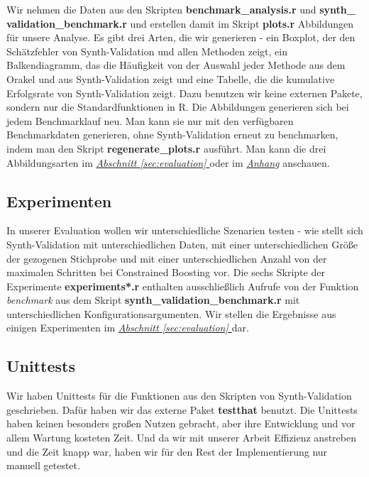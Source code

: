 \documentclass[12pt,a4paper,twoside]{scrartcl}
\numberwithin{equation}{section}
\newcommand{\refsec}[1]{\emph{\hyperref[#1]{Abschnitt \ref*{#1} }}}
\begin{document}
Wir nehmen die Daten aus den Skripten \textbf{benchmark\_analysis.r} und \textbf{synth\_\\validation\_benchmark.r} und erstellen damit im Skript \textbf{plots.r} Abbildungen für unsere Analyse. Es gibt drei Arten, die wir generieren - ein Boxplot, der den Schätzfehler von Synth-Validation und allen Methoden zeigt, ein Balkendiagramm, das die Häufigkeit von der Auswahl jeder Methode aus dem Orakel und aus Synth-Validation zeigt und eine Tabelle, die die kumulative Erfolgsrate von Synth-Validation zeigt. Dazu benutzen wir keine externen Pakete, sondern nur die Standardfunktionen in R. Die Abbildungen generieren sich bei jedem Benchmarklauf neu. Man kann sie nur mit den verfügbaren Benchmarkdaten generieren, ohne Synth-Validation erneut zu benchmarken, indem man den Skript \textbf{regenerate\_plots.r} ausführt. Man kann die drei Abbildungsarten im \refsec{sec:evaluation} oder im \emph{\hyperref[anhang]{Anhang}} anschauen.


\subsection{Experimenten}\label{subsec:experimenten}
In unserer Evaluation wollen wir unterschiedliche Szenarien testen - wie stellt sich Synth-Validation mit unterschiedlichen Daten, mit einer unterschiedlichen Größe der gezogenen Stichprobe und mit einer unterschiedlichen Anzahl von der maximalen Schritten bei Constrained Boosting vor. Die sechs Skripte der Experimente \textbf{experiments*.r} enthalten ausschließlich Aufrufe von der Funktion \emph{benchmark} aus dem Skript \textbf{synth\_validation\_benchmark.r} mit unterschiedlichen Konfigurationsargumenten. Wir stellen die Ergebnisse aus einigen Experimenten im \refsec{sec:evaluation} dar.\par

\subsection{Unittests}\label{subsec:unitTests}
Wir haben Unittests für die Funktionen aus den Skripten von Synth-Validation geschrieben. Dafür haben wir das externe Paket \textbf{testthat} benutzt. Die Unittests haben keinen besonders großen Nutzen gebracht, aber ihre Entwicklung und vor allem Wartung kosteten Zeit. Und da wir mit unserer Arbeit Effizienz anstreben und die Zeit knapp war, haben wir für den Rest der Implementierung nur manuell getestet.\par 
      	  	
\end{document}
